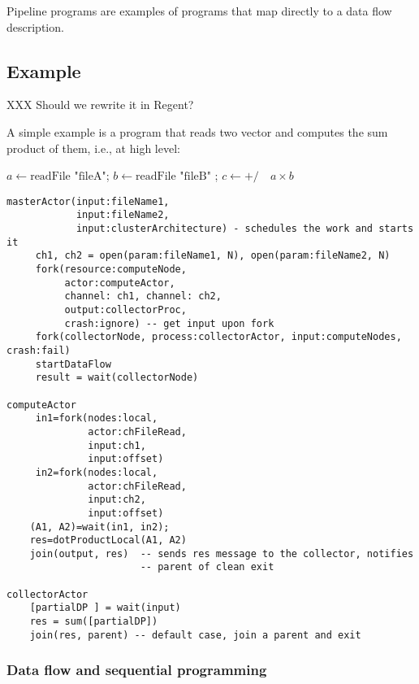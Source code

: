 \documentclass[11pt,a4paper]{article}
\begin{document}
Pipeline programs are examples of programs that map directly to a data flow description. 



\subsection{Example}

XXX Should we rewrite it in Regent? 

\begin{Example}

  A simple example is a program that reads two vector and computes the
  sum product of them, i.e., at high level:
\begin{algorithmic}
  \State $a\gets \textrm{readFile "fileA"}$;  $b\gets \textrm{readFile "fileB"}$ ; $c\gets  \textrm{+/} \quad a\times b$
\end{algorithmic}  


\begin{lstlisting}
masterActor(input:fileName1, 
            input:fileName2, 
            input:clusterArchitecture) - schedules the work and starts it
     ch1, ch2 = open(param:fileName1, N), open(param:fileName2, N)
     fork(resource:computeNode, 
          actor:computeActor, 
          channel: ch1, channel: ch2,
          output:collectorProc,
          crash:ignore) -- get input upon fork
     fork(collectorNode, process:collectorActor, input:computeNodes, crash:fail)
     startDataFlow
     result = wait(collectorNode)

computeActor
     in1=fork(nodes:local, 
              actor:chFileRead, 
              input:ch1,
              input:offset)
     in2=fork(nodes:local, 
              actor:chFileRead, 
              input:ch2,
              input:offset)
    (A1, A2)=wait(in1, in2);
    res=dotProductLocal(A1, A2)
    join(output, res)  -- sends res message to the collector, notifies
                       -- parent of clean exit

collectorActor
    [partialDP ] = wait(input)
    res = sum([partialDP])
    join(res, parent) -- default case, join a parent and exit

\end{lstlisting}

\end{Example}

\subsubsection{Data flow and sequential programming}
\end{document}
